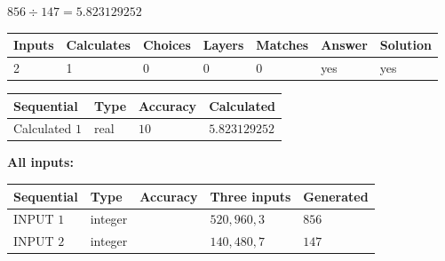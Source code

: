\documentclass{ctexart}
\begin{document}
 

$ %
856 \div  %
147=   %
5.823129252$
 
 
\noindent{}
 
 

 
   
   
   
   
\noindent\begin{tabular}{|l|l|l|l|l|l|l|}
 \hline
Inputs & Calculates & Choices & Layers & Matches & Answer & Solution \\ \hline
 2  & 
 1  & 
 0
  & 
 0  & 
 0  & 
  yes & 
  yes 
  \\ \hline
 \end{tabular}
   
   
   
   
\noindent{}
   
   
  
  
\noindent\begin{tabular}{|l|l|l|l|}
\hline
 Sequential & Type & Accuracy & Calculated \\ 
\hline
 
 
  Calculated $  1 $ & real & $  10  $ & 
 $ 5.823129252 $ 
 \\  \hline  
 \end{tabular}
   
   
   
   
\noindent\vspace{0.1in}\hspace{-0.08in} {\textbf{\Large{All inputs: }}}
   
   
  
  
\noindent\begin{tabular}{|l|l|l|l|l|}
\hline
 Sequential & Type & Accuracy & Three inputs & Generated \\ 
\hline
 
 
  INPUT $  1 $ & integer &  & $
 520
 , 
 960
 , 
 3
 $ & $ 856 $ 
 \\  \hline  
 
 
  INPUT $  2 $ & integer &  & $
 140
 , 
 480
 , 
 7
 $ & $ 147 $ 
 \\  \hline  
 \end{tabular}
   
   
  
\vspace{0.2in}
  
\end{document}
